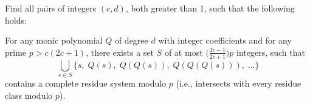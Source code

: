 Find all pairs of integers $(c, d)$, both greater than 1, such that the following holds:

For any monic polynomial $Q$ of degree $d$ with integer coefficients and for any prime $p > c(2c+1)$, there exists a set $S$ of at most $\big(\tfrac{2c-1}{2c+1}\big)p$ integers, such that
\[\bigcup_{s \in S} \{s,\; Q(s),\; Q(Q(s)),\; Q(Q(Q(s))),\; \dots\}\]
contains a complete residue system modulo $p$ (i.e., intersects with every residue class modulo $p$).